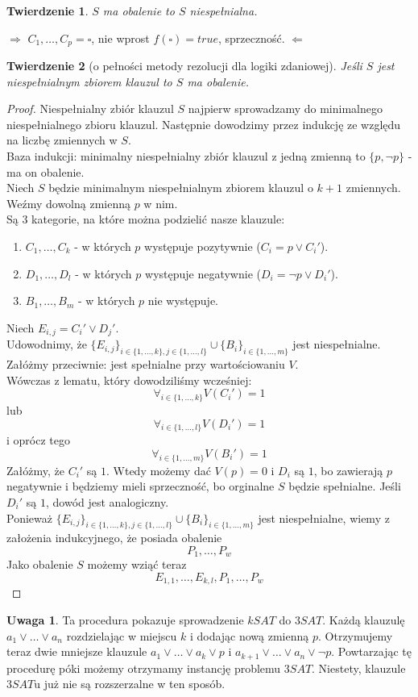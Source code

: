 \documentclass[10pt,a4paper]{article}
\theoremstyle{plain}
\newtheorem{theorem}{Twierdzenie}
\theoremstyle{definition}
\newtheorem*{remark}{Uwaga}
\begin{document}
\begin{theorem}
$S$ ma obalenie to $S$ niespełnialna.
\end{theorem}
$\Rightarrow$ $C_1, \ldots, C_p = \square$, nie wprost $f(\square) = true$, sprzeczność.
$\Leftarrow$ \\
\begin{theorem}[o pełności metody rezolucji dla logiki zdaniowej]
Jeśli $S$ jest niespełnialnym zbiorem klauzul to $S$ ma obalenie.
\end{theorem}
\begin{proof}
Niespełnialny zbiór klauzul $S$ najpierw sprowadzamy do minimalnego niespełnialnego zbioru klauzul.
Następnie dowodzimy przez indukcję ze względu na liczbę zmiennych w $S$.\\
Baza indukcji: minimalny niespełnialny zbiór klauzul z jedną zmienną to $\{p, \lnot p\}$ - ma on obalenie.\\
Niech $S$ będzie minimalnym niespełnialnym zbiorem klauzul o $k+1$ zmiennych. Weźmy dowolną zmienną $p$ w nim.\\
Są $3$ kategorie, na które można podzielić nasze klauzule:
\begin{enumerate}
 \item $C_1, \ldots, C_k$ - w których $p$ występuje pozytywnie ($C_i = p \vee C_i'$).
 \item $D_1, \ldots, D_l$ - w których $p$ występuje negatywnie ($D_i = \lnot p \vee D_i'$).
 \item $B_1, \ldots, B_m$ - w których $p$ nie występuje.
\end{enumerate}
Niech $E_{i,j} = C_i' \vee D_j'$.\\
Udowodnimy, że $\{E_{i,j}\}_{i\in\{1,\ldots,k\},j\in\{1,\ldots,l\}} \cup \{B_i\}_{i\in\{1,\ldots,m\}}$ jest niespełnialne.\\
Załóżmy przeciwnie: jest spełnialne przy wartościowaniu $V$.\\
Wówczas z lematu, który dowodziliśmy wcześniej:
$$\forall_{i\in\{1,\ldots,k\}} V(C_i') = 1$$
lub
$$\forall_{i\in\{1,\ldots,l\}} V(D_i') = 1$$
i oprócz tego
$$\forall_{i\in\{1,\ldots,m\}} V(B_i') = 1$$
Załóżmy, że $C_i'$ są $1$. Wtedy możemy dać $V(p) = 0$ i $D_i$ są $1$, bo zawierają $p$ negatywnie i będziemy mieli
sprzeczność, bo orginalne $S$ będzie spełnialne.
Jeśli $D_i'$ są $1$, dowód jest analogiczny.\\
Ponieważ $\{E_{i,j}\}_{i\in\{1,\ldots,k\},j\in\{1,\ldots,l\}} \cup \{B_i\}_{i\in\{1,\ldots,m\}}$ jest niespełnialne,
wiemy z założenia indukcyjnego, że posiada obalenie
$$P_1,\ldots,P_w$$
Jako obalenie $S$ możemy wziąć teraz
$$E_{1,1},\ldots,E_{k,l},P_1,\ldots,P_w$$
\end{proof}
\begin{remark}
Ta procedura pokazuje sprowadzenie $kSAT$ do $3SAT$. Każdą klauzulę $a_1 \vee \ldots \vee a_n$
rozdzielając w miejscu $k$ i dodając nową zmienną $p$. Otrzymujemy teraz dwie mniejsze klauzule
$a_1 \vee \ldots \vee a_k \vee p$ i $a_{k+1} \vee \ldots \vee a_n \vee \lnot p$.
Powtarzając tę procedurę póki możemy otrzymamy instancję problemu $3SAT$.
Niestety, klauzule $3SAT$u już nie są rozszerzalne w ten sposób.
\end{remark}
\end{document}
